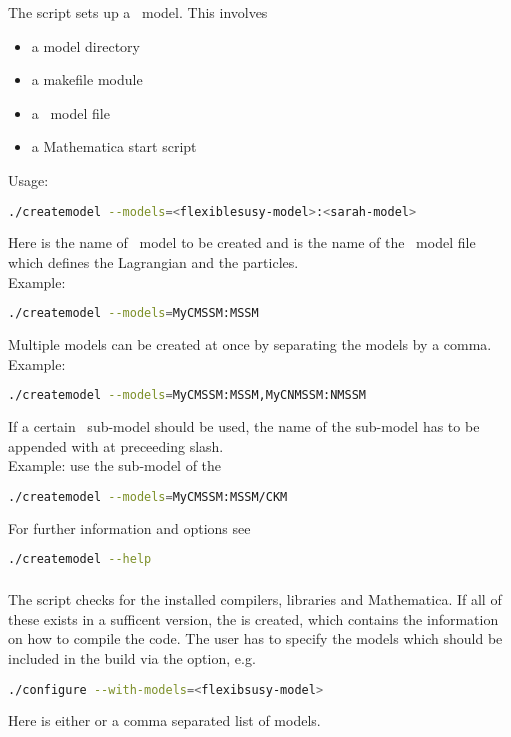 The  script sets up a \flexisusy\ model.  This involves
%
\begin{itemize}
\item a model directory 
\item a makefile module 
\item a \flexisusy\ model file 
\item a Mathematica start script 
\end{itemize}
%
Usage:
\begin{lstlisting}[language=bash]
./createmodel --models=<flexiblesusy-model>:<sarah-model>
\end{lstlisting}
Here  is the name of \flexisusy\ model
to be created and  is the name of the \sarah\
model file which defines the Lagrangian and the particles.\\
Example:
\begin{lstlisting}[language=bash]
./createmodel --models=MyCMSSM:MSSM
\end{lstlisting}
%
Multiple models can be created at once by separating the models by a
comma.\\
Example:
\begin{lstlisting}[language=bash]
./createmodel --models=MyCMSSM:MSSM,MyCNMSSM:NMSSM
\end{lstlisting}
%
If a certain \sarah\ sub-model should be used, the name of the sub-model
has to be appended with at preceeding slash.\\
Example: use the  sub-model of the 
\begin{lstlisting}[language=bash]
./createmodel --models=MyCMSSM:MSSM/CKM
\end{lstlisting}
%
For further information and options see
\begin{lstlisting}[language=bash]
./createmodel --help
\end{lstlisting}

\subsubsection{}

The  script checks for the installed compilers,
libraries and Mathematica.  If all of these exists in a sufficent
version, the \code{Makefile} is created, which contains the information
on how to compile the code.  The user has to specify the models which
should be included in the build via the \code{--with-models=} option,
e.g.
%
\begin{lstlisting}[language=bash]
./configure --with-models=<flexibsusy-model>
\end{lstlisting}
%
Here  is either  or a comma
separated list of \flexisusy models.

